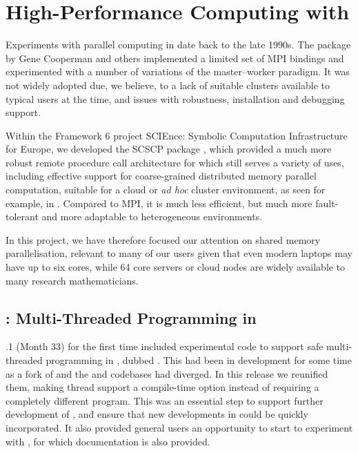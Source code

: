 \section{High-Performance Computing with \GAP}\label{sec:hpc}

Experiments with parallel computing in \GAP date back to the late
1990s. The  package by Gene Cooperman and others \cite{pargap}
implemented a limited set of MPI bindings and experimented with a
number of variations of the master--worker paradigm. It was not
widely adopted due, we believe, to a lack of suitable clusters available to typical
\GAP users at the time, and issues with robustness, installation and
debugging support.

Within the Framework 6 project SCIEnce: Symbolic Computation
Infrastructure for Europe, we developed the SCSCP package \cite{SCSCP}, which
provided a much more robust remote procedure call architecture for
\GAP which still serves a variety of uses, including effective support
for coarse-grained distributed memory parallel computation, suitable
for a cloud or \textit{ad hoc} cluster environment, as seen for
example, in \cite{loughlin}. Compared to MPI, it is much less
efficient, but much more fault-tolerant and more adaptable to
heterogeneous environments.

In this project, we have therefore focused our attention on shared
memory parallelisation, relevant to many of our users given that even
modern laptops may have up to six cores, while 64 core servers or
cloud nodes are widely available to many research mathematicians.

\subsection{\HPCGAP: Multi-Threaded Programming in \GAP}\label{hpc-gap}

.1 (Month 33) for the first time included experimental code to 
support safe multi-threaded programming in \GAP, dubbed \HPCGAP. This
had been in development for some time as a fork of \GAP and the \HPCGAP and \GAP
codebases had diverged. In this release we reunified them,
making thread support a compile-time option instead of requiring a completely
different program. This was an essential step to support further development of
\HPCGAP, and ensure that new developments in \GAP could be quickly
incorporated. It also provided general \GAP users an opportunity to start to experiment 
with \HPCGAP, for which documentation is also provided.

